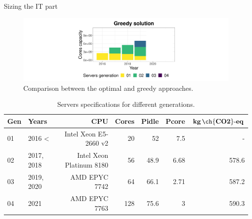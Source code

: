 \documentclass[Ligatures=TeX,table,svgnames,usetotalslideindicator,compress,10pt,aspectratio=169]{beamer}
\begin{document}
\begin{frame}{Sizing the IT part}
  \begin{center}
    \begin{figure}[h]    
      \centering
      \includegraphics[width=.9\textwidth]{images/cloud_federation_evolution_lifetime_year4.png}
      \caption{Comparison between the optimal and greedy approaches.}
    \end{figure}    
  \end{center}  

  \begin{table}[h]
  \tiny
  \label{tab:servers_specs} 
  \caption{Servers specifications for different generations.} \centering
  \begin{tabular}{|l|l|r|r|r|r|r|}
  \hline    
  \textbf{Gen} & \textbf{Years} & \textbf{CPU} &   \textbf{Cores} & \textbf{Pidle}  & \textbf{Pcore}  & \textbf{$\mathbf{kg\,\ch{CO2}\text{-}eq}$}  \\
  \hline
  01      &  2016 < & Intel Xeon E5-2660 v2 & 20 & 52 & 7.5  & -   \\
  \hline
  02 & 2017, 2018 & Intel Xeon Platinum 8180 & 56 & 48.9 & 6.68  & 578.6   \\
  \hline
  03   & 2019, 2020 & AMD EPYC 7742  & 64 & 66.1 & 2.71  & 587.2 \\
  \hline
  04   & 2021      & AMD EPYC 7763 & 128 & 75.6 & 3     & 590.3 \\
  \hline
  
\end{tabular}  
\end{table}

\end{frame}
\addtocounter{framenumber}{-1}
\end{document}
